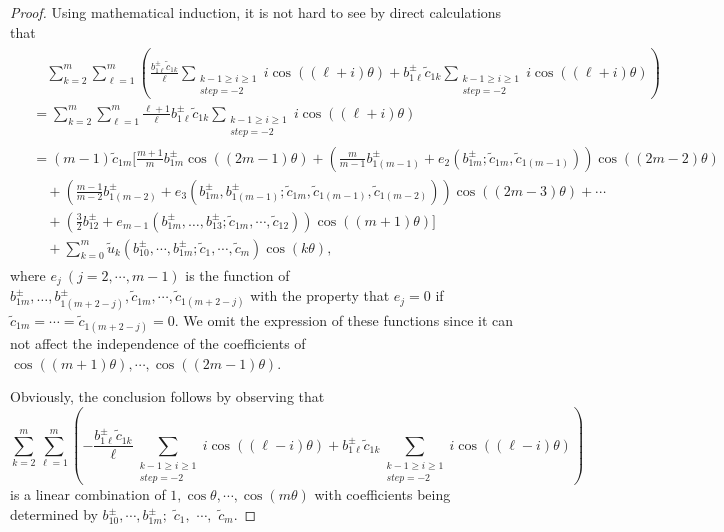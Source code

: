 \documentclass[11pt]{amsart}
\theoremstyle{remark}
\theoremstyle{definition}
\begin{document}
\begin{proof}
Using mathematical induction, it is not hard to see by direct calculations that
\begin{align} \label{equa26}
\begin{split}
&\quad \sum_{k=2}^{m}\sum_{\ell=1}^{m}\left(\frac{b_{1\ell}^{\pm}\tilde{c}_{1k}}{\ell}\sum_{\substack{k-1\geq i\geq 1\\ step=-2}}i\cos((\ell+i)\theta)+{b_{1\ell}^{\pm}\tilde{c}_{1k}}\sum_{\substack{k-1\geq i\geq 1\\ step=-2}}i\cos((\ell+i)\theta)\right)\\
& = \sum_{k=2}^{m}\sum_{\ell=1}^{m}\frac{\ell+1}{\ell}b_{1\ell}^{\pm}\tilde{c}_{1k}\sum_{\substack{k-1\geq i\geq 1\\ step=-2}}i\cos((\ell+i)\theta)\\
&= (m-1)\tilde{c}_{1m}\bigg[\frac{m+1}{m}b_{1m}^{\pm}\cos((2m-1)\theta)+\left(\frac{m}{m-1}b_{1(m-1)}^{\pm}+e_2(b_{1m}^{\pm};\tilde{c}_{1m},\tilde{c}_{1(m-1)})\right)\cos((2m-2)\theta)\\
&\quad +\left(\frac{m-1}{m-2}b_{1(m-2)}^{\pm}+e_3(b_{1m}^{\pm},b_{1(m-1)}^{\pm};\tilde{c}_{1m},\tilde{c}_{1(m-1)},\tilde{c}_{1(m-2)})\right)\cos((2m-3)\theta) +\cdots\\
&\quad+\left(\frac{3}{2}b_{12}^{\pm}+e_{m-1}(b_{1m}^{\pm},\dots,b_{13}^{\pm};\tilde{c}_{1m},\cdots,\tilde{c}_{12})\right)\cos((m+1)\theta)\bigg]\\
&\quad+ \sum_{k=0}^{m}\tilde{u}_k(b_{10}^{\pm},\cdots,b_{1m}^{\pm};\tilde{c}_1,\cdots,\tilde{c}_m)\cos(k\theta),
\end{split}\end{align}
where $ {e}_j \ (j=2,\cdots,m-1)$ is the function of $b_{1m}^{\pm},\dots,b_{1(m+2-j)}^{\pm},\tilde{c}_{1m},\cdots,\tilde{c}_{1(m+2-j)}$ with the property that
$ {e}_j =0$ if  $\tilde{c}_{1m}=\cdots=\tilde{c}_{1(m+2-j)}=0$.   We omit the expression of these functions since it can not affect the        independence of the coefficients of
$\cos((m+1)\theta), \cdots, \cos((2m-1)\theta)$.








Obviously, the conclusion follows by observing that
\begin{equation*}
 \sum_{k=2}^{m}\sum_{\ell=1}^{m}\left(-\frac{b_{1\ell}^{\pm}\tilde{c}_{1k}}{\ell}\sum_{\substack{k-1\geq i\geq 1\\ step=-2}}i\cos((\ell-i)\theta)+{b_{1\ell}^{\pm}\tilde{c}_{1k}}\sum_{\substack{k-1\geq i\geq 1\\ step=-2}}i\cos((\ell-i)\theta)\right)
\end{equation*}
 is a linear combination of $ 1, \cos\theta, \cdots, \cos(m\theta)$  with coefficients being determined by $b_{10}^{\pm},\cdots,b_{1m}^{\pm};$ $\tilde{c}_1,$ $\cdots,$ $\tilde{c}_m$.  \end{proof}
\end{document}
